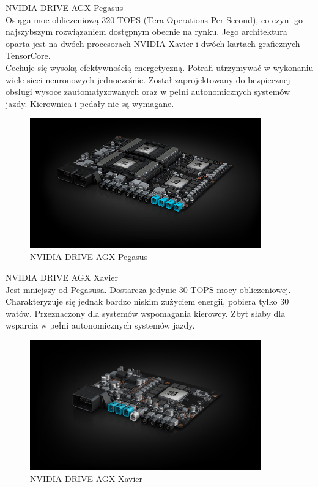 \begin{enumerate*}
\item NVIDIA DRIVE AGX Pegasus \\
Osiąga moc obliczeniową 320 TOPS (Tera Operations Per Second), co czyni go najszybszym rozwiązaniem dostępnym obecnie na rynku. Jego architektura oparta jest na dwóch procesorach NVIDIA Xavier i dwóch kartach graficznych TensorCore. \\
Cechuje się wysoką efektywnością energetyczną. Potrafi utrzymywać w wykonaniu wiele sieci neuronowych jednocześnie. Został zaprojektowany do bezpiecznej obsługi wysoce zautomatyzowanych oraz w pełni autonomicznych systemów jazdy. Kierownica i pedały nie są wymagane.
\vspace{0.3cm}
\begin{figure}[H]
\centering
\includegraphics[width=10cm]{resources/figures/nv-drive-pegasus.jpg}
\caption{NVIDIA DRIVE AGX Pegasus}
\label{NvidiaDrivePegasus}
\end{figure}

\item NVIDIA DRIVE AGX Xavier \\
Jest mniejszy od Pegasusa. Dostarcza jedynie 30 TOPS mocy obliczeniowej. Charakteryzuje się jednak bardzo niskim zużyciem energii, pobiera tylko 30 watów. Przeznaczony dla systemów wspomagania kierowcy. Zbyt słaby dla wsparcia w pełni autonomicznych systemów jazdy.
\vspace{0.3cm}
\begin{figure}[H]
\centering
\includegraphics[width=10cm]{resources/figures/nv-drive-xavier.jpg}
\caption{NVIDIA DRIVE AGX Xavier}
\label{NvidiaDriveXavier}
\end{figure}


\end{enumerate*}
